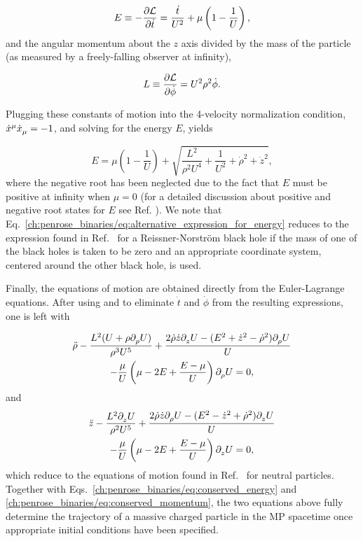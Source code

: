 \begin{equation}
  E \equiv -\frac{\partial \mathcal{L}}{\partial \dot{t}} = \frac{\dot{t}}{U^2} + \mu\left(1-\frac{1}{U}\right),
  \label{ch:penrose_binaries/eq:conserved_energy}
\end{equation}
%
and the angular momentum about the $z$ axis divided by the mass of the particle (as measured by a freely-falling observer at infinity),

\begin{equation}
  L \equiv \frac{\partial \mathcal{L}}{\partial \dot{\phi}} = U^2 \rho^2 \dot{\phi}.
  \label{ch:penrose_binaries/eq:conserved_momentum}
\end{equation}

Plugging these constants of motion into the 4-velocity normalization condition, $\tens{\dot{x}}{\mu}{}\tens{\dot{x}}{}{\mu} = -1$, and solving for the energy $E$, yields

\begin{equation}
  E = \mu\left(1-\frac{1}{U}\right) + \sqrt{\frac{L^2}{\rho^2U^4} + \frac{1}{U^2} + \dot{\rho}^2 + \dot{z}^2}
  \label{ch:penrose_binaries/eq:alternative_expression_for_energy},
\end{equation}
where the negative root has been neglected due to the fact that $E$ must be positive at infinity when $\mu = 0$ (for a detailed discussion about positive and negative root states for $E$ see Ref. \cite{RUFFINI1971}). We note that Eq.~\eqref{ch:penrose_binaries/eq:alternative_expression_for_energy} reduces to the expression found in Ref.~\cite{DENARDO1973} for a Reissner-Norstr{\"o}m black hole if the mass of one of the black holes is taken to be zero and an appropriate coordinate system, centered around the other black hole, is used.

Finally, the equations of motion are obtained directly from the Euler-Lagrange equations. After using  and  to eliminate $\dot{t}$ and $\dot{\phi}$ from the resulting expressions, one is left with

\begin{multline}
  \ddot{\rho}-\frac{L^2(U+\rho\indexdel{\rho}U)}{\rho^3 U^5} + \frac{2\dot{\rho}\dot{z}\indexdel{z}U - (E^2 + \dot{z}^2 - \dot{\rho}^2)\indexdel{\rho}U}{U} \\- \frac{\mu}{U}\left(\mu-2E+\frac{E-\mu}{U}\right)\indexdel{\rho}U = 0,
  \label{ch:penrose_binaries/eq:ode_for_rho_motion}
\end{multline}
%
and
\begin{multline}
  \ddot{z}-\frac{L^2\indexdel{z}U}{\rho^2 U^5} + \frac{2\dot{\rho}\dot{z}\indexdel{\rho}U - (E^2 - \dot{z}^2 + \dot{\rho}^2)\indexdel{z}U}{U} \\- \frac{\mu}{U}\left(\mu-2E+\frac{E-\mu}{U}\right)\indexdel{z}U = 0,
  \label{ch:penrose_binaries/eq:ode_for_z_motion}
\end{multline}
which reduce to the equations of motion found in Ref.~\cite{ASSUMPCAO2018} for neutral particles. Together with Eqs.~\eqref{ch:penrose_binaries/eq:conserved_energy} and \eqref{ch:penrose_binaries/eq:conserved_momentum}, the two equations above fully determine the trajectory of a massive charged particle in the MP spacetime once appropriate initial conditions have been specified.

